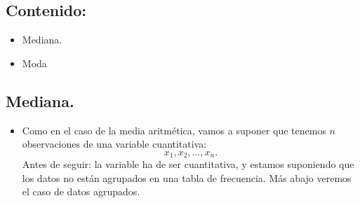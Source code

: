\subsection*{Contenido:}
\begin{itemize}
 \item Mediana.
 \item Moda
\end{itemize}


\subsection{Mediana. }

\begin{itemize}
    \item Como en el caso de la media aritmética, vamos a suponer que tenemos $n$ observaciones de una variable cuantitativa:
        \[x_1,x_2,\ldots,x_n.\]
        Antes de seguir: la variable ha de ser cuantitativa, y estamos suponiendo que los datos no están agrupados en una tabla de frecuencia. Más abajo veremos el caso de datos agrupados.


\end{itemize}
